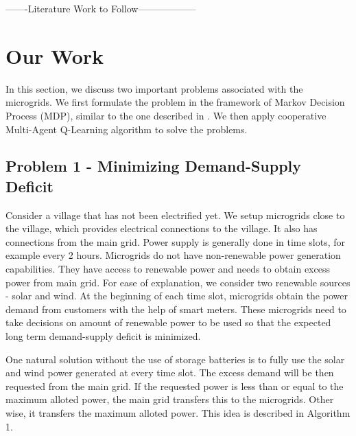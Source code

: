 \documentclass[conference]{IEEEtran}
\begin{document}
-------Literature Work to Follow------------------




\section{Our Work}
In this section, we discuss two important problems associated with the microgrids. We first formulate the problem in the framework of Markov Decision Process (MDP), similar to the one described in \cite{goodmdp}. We then apply cooperative Multi-Agent Q-Learning algorithm to solve the problems.

\subsection{Problem 1 - Minimizing Demand-Supply Deficit}

Consider a village that has not been electrified yet. We setup microgrids close to the village, which provides electrical connections to the village. It also has connections from the main grid. Power supply is generally done in time slots, for example every 2 hours. Microgrids do not have non-renewable power generation capabilities. They have access to renewable power and needs to obtain excess power from main grid. For ease of explanation, we consider two renewable sources - solar and wind. At the beginning of each time slot, microgrids obtain the power demand from customers with the help of smart meters. These microgrids need to take decisions on amount of renewable power to be used so that the expected long term demand-supply deficit is minimized.

One natural solution without the use of storage batteries is to fully use the solar and wind power generated at every time slot. The excess demand will be then requested from the main grid. If the requested power is less than or equal to the maximum alloted power, the main grid transfers this to the microgrids. Other wise, it transfers the maximum alloted power. This idea is described in Algorithm 1.
\end{document}
